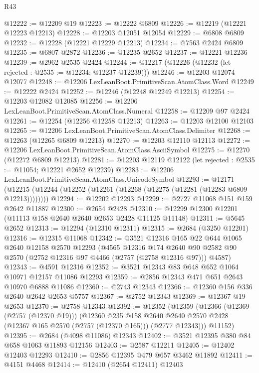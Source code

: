 \begin{lexlean}{R43}
\begin{coremodule}
@12222 := @12209 @19
@12223 := @12222 @6809
@12226 := @12219 (@12221 @12223 @12213)
@12228 := @12203 @12051 @12054
@12229 := @6808 @6809
@12232 := @12228 (@12221 @12229 @12213)
@12234 := @7563 @2424 @6809
@12235 := @6807 @2872
@12236 := @12235 @2652
@12237 := @12221 @12236
@12239 := @2962 @2535 @2424
@12244 := @12217 (@12226 (@12232 (let rejected : @2535 := @12234; @12237 @12239)))
@12246 := @12203 @12074 @12077
@12248 := @12206 LexLeanBoot.PrimitiveScan.AtomClass.Word
@12249 := @12222 @2424
@12252 := @12246 (@12248 @12249 @12213)
@12254 := @12203 @12082 @12085
@12256 := @12206 LexLeanBoot.PrimitiveScan.AtomClass.Numeral
@12258 := @12209 @97 @2424
@12261 := @12254 (@12256 @12258 @12213)
@12263 := @12203 @12100 @12103
@12265 := @12206 LexLeanBoot.PrimitiveScan.AtomClass.Delimiter
@12268 := @12263 (@12265 @6809 @12213)
@12270 := @12203 @12110 @12113
@12272 := @12206 LexLeanBoot.PrimitiveScan.AtomClass.AsciiSymbol
@12275 := @12270 (@12272 @6809 @12213)
@12281 := @12203 @12119 @12122 (let rejected : @2535 := @11054; @12221 @2652 @12239)
@12283 := @12206 LexLeanBoot.PrimitiveScan.AtomClass.UnicodeSymbol
@12293 := @12171
    (@12215 (@12244 (@12252 (@12261 (@12268 (@12275 (@12281 (@12283 @6809 @12213))))))))
@12294 := @12202 @12293
@12299 := @2727 @11068 @151 @159 @2642 @11887
@12300 := @2654 @2428
@12310 := @12299 @12300 @12201 (@11113 @158 @2640 @2640 @2653 @2428 @11125 @11148)
@12311 := @5645 @2652
@12313 := @12294 (@12310 @12311)
@12315 := @2684 (@3250 @12201)
@12316 := @12315 @11068
@12342 := @3521
    @12316
    @165
    @22
    @644
    @1065
    @2640
    @12158
    @2570
    @12293
    (@4565
      @12316
      @174
      @2640
      @90
      @2582
      @90
      @2570
      (@2752 @12316 @97 @4466 (@2757 (@2758 @12316 @97)))
      @4587)
@12343 := @4591 @12316
@12352 := @3521 @12343 @83 @648 @652 @1064 @10971 @12157 @11086 @12293
@12359 := @2856 @12343 @471 @651 @2643 @10970 @6888 @11086
@12360 := @2743 @12343
@12366 := @12360 @156 @336 @2640 @2642 @2653 @5757
@12367 := @2752 @12343
@12369 := @12367 @19 @2653
@12370 := @2758 @12343
@12392 := @12352
    (@12359
      (@12366
        (@12369 (@2757 (@12370 @19)))
        (@12360
          @235
          @158
          @2640
          @2640
          @2570
          @2428
          (@12367 @165 @2570 (@2757 (@12370 @165)))
          (@2777 @12343)))
      @11152)
@12395 := @2684 (@4098 @11086) @12343
@12402 := @3521 @12395 @380 @84 @658 @1063 @11893 @12156
@12403 := @2587 @12211
@12405 := @12402 @12403 @12293
@12410 := @2856 @12395 @479 @657 @3462 @11892
@12411 := @4151 @4468
@12414 := @12410 (@2654 @12411) @12403

\end{coremodule}
\end{lexlean}
